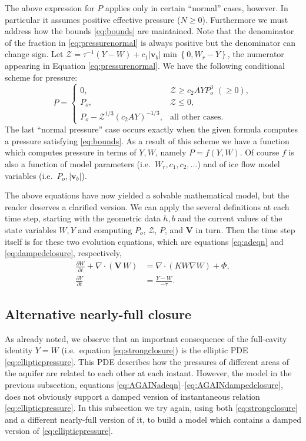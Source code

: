 \documentclass[12pt,final]{amsart}%
\newcommand\bv{\mathbf{v}}
\newcommand\bV{\mathbf{V}}
\newcommand{\Div}{\nabla\cdot}
\newcommand{\grad}{\nabla}
\begin{document}
The above expression for $P$ applies only in certain ``normal'' cases, however.  In particular it assumes positive effective pressure ($N\ge 0$).  Furthermore we must address how the bounds \eqref{eq:bounds} are maintained.  Note that the denominator of the fraction in \eqref{eq:pressurenormal} is always positive but the denominator can change sign.  Let $\mathcal{Z} = \tau^{-1} (Y-W) + c_1 |\bv_b| \min\left\{0,W_r - Y\right\}$,  the numerator appearing in Equation \eqref{eq:pressurenormal}.  We have the following conditional scheme for pressure:
\begin{equation}
P = \begin{cases}
0, & \mathcal{Z} \ge c_2 A Y P_o^3\,\, (\ge 0) , \\
P_o, & \mathcal{Z} \le 0, \\
P_o - \mathcal{Z}^{1/3} (c_2 A Y)^{-1/3}, & \text{all other cases}.
\end{cases} \label{eq:pressureWY}
\end{equation}
The last ``normal pressure'' case occurs exactly when the given formula computes a pressure satisfying \eqref{eq:bounds}.  As a result of this scheme we have a function which computes pressure in terms of $Y,W$, namely $P = f(Y,W)$.  Of course $f$ is also a function of model parameters (i.e.~$W_r,c_1,c_2,\dots$) and of ice flow model variables (i.e.~$P_o,|\bv_b|$).

The above equations have now yielded a solvable mathematical model, but the reader deserves a clarified version.  We can apply the several definitions at each time step, starting with the geometric data $h,b$ and the current values of the state variables $W,Y$ and computing $P_o$, $\mathcal{Z}$, $P$, and $\bV$ in turn.  Then the time step itself is for these two evolution equations, which are equations \eqref{eq:adeqn} and \eqref{eq:dampedclosure}, respectively,
\begin{align}
\frac{\partial W}{\partial t} + \Div\left(\bV\, W\right) &= \Div \left(K W \grad W\right) + \Phi, \label{eq:AGAINadeqn} \\
\frac{\partial Y}{\partial t} &= \frac{Y - W}{-\tau}. \label{eq:AGAINdampedclosure}
\end{align}

\subsection*{Alternative nearly-full closure}  As already noted, we observe that an important consequence of the full-cavity identity $Y=W$ (i.e.~equation \eqref{eq:strongclosure}) is the elliptic PDE \eqref{eq:ellipticpressure}.  This PDE describes how the pressures of different areas of the aquifer are related to each other at each instant.  However, the model in the previous subsection, equations \eqref{eq:AGAINadeqn}--\eqref{eq:AGAINdampedclosure}, does not obviously support a damped version of instantaneous relation \eqref{eq:ellipticpressure}.  In this subsection we try again, using both \eqref{eq:strongclosure} and a different nearly-full version of it, to build a model which contains a damped version of \eqref{eq:ellipticpressure}.
\end{document}
